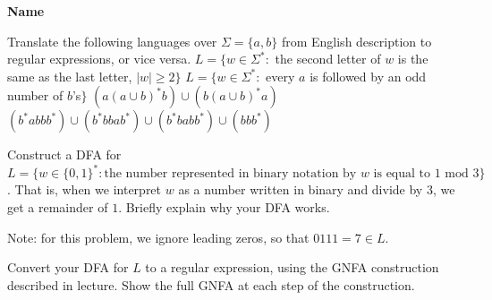 \documentclass[letterpaper, ps]{cs121}
\begin{document}



\vspace{3mm}
\begin{center} \bf{Name} \end{center}


Translate the following languages over $\Sigma=\{a,b\}$ from English description to regular expressions, or vice versa.
\subproblem $L = \{w\in\Sigma^*:$ the second letter of $w$ is the same as the last letter, $|w| \geq 2 \}$
\subproblem $L = \{w\in\Sigma^*:$ every $a$ is followed by an odd number of $b$'s$\}$
\subproblem $(a(a\cup b)^*b) \cup (b(a\cup b)^*a)$
\subproblem $(b^*abbb^*) \cup (b^*bbab^*) \cup (b^*babb^*) \cup (bbb^*)$



\subproblem Construct a DFA for $L = \{w \in \{0,1\}^* : \text{the number represented in binary notation by } w \text{ is equal to $1$ mod $3$}\}$.  That is, when we interpret $w$ as a number written in binary and divide by $3$, we get a remainder of $1$. Briefly explain why your DFA works.

Note: for this problem, we ignore leading zeros, so that $0111=7 \in L$.

\subproblem Convert your DFA for $L$ to a regular expression, using the GNFA construction described in lecture.  Show the full GNFA at each step of the construction.


\pagebreak

\end{document}
